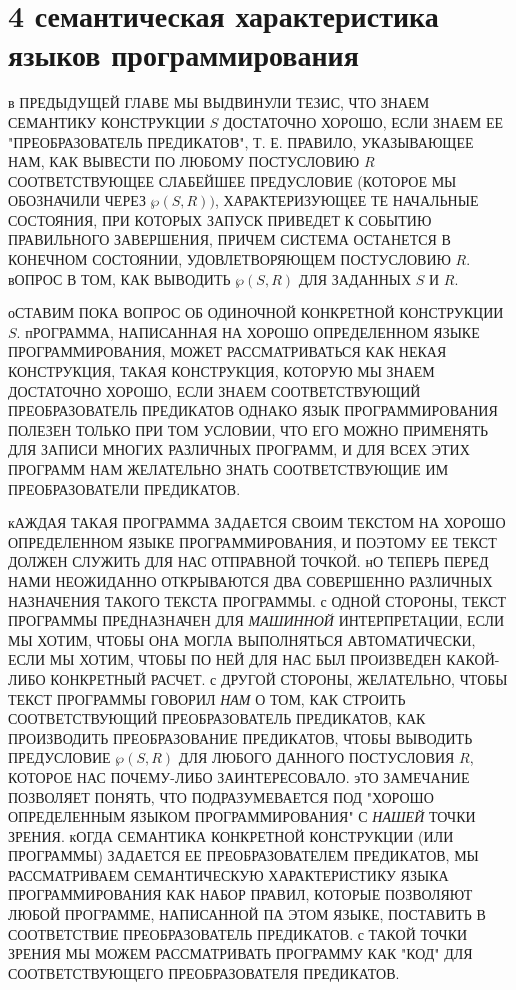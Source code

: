 
\chapter{4 семантическая характеристика языков 
программирования}
в ПРЕДЫДУЩЕЙ ГЛАВЕ МЫ ВЫДВИНУЛИ ТЕЗИС, ЧТО ЗНАЕМ СЕМАНТИКУ 
КОНСТРУКЦИИ $S$ ДОСТАТОЧНО ХОРОШО, ЕСЛИ ЗНАЕМ ЕЕ 
"ПРЕОБРАЗОВАТЕЛЬ ПРЕДИКАТОВ", Т. Е. ПРАВИЛО, УКАЗЫВАЮЩЕЕ НАМ, 
КАК ВЫВЕСТИ ПО ЛЮБОМУ ПОСТУСЛОВИЮ $R$ СООТВЕТСТВУЮЩЕЕ 
СЛАБЕЙШЕЕ ПРЕДУСЛОВИЕ (КОТОРОЕ МЫ ОБОЗНАЧИЛИ ЧЕРЕЗ 
$\wp(S, R))$, ХАРАКТЕРИЗУЮЩЕЕ ТЕ НАЧАЛЬНЫЕ СОСТОЯНИЯ, ПРИ 
КОТОРЫХ ЗАПУСК ПРИВЕДЕТ К СОБЫТИЮ ПРАВИЛЬНОГО ЗАВЕРШЕНИЯ, 
ПРИЧЕМ СИСТЕМА ОСТАНЕТСЯ В КОНЕЧНОМ СОСТОЯНИИ, 
УДОВЛЕТВОРЯЮЩЕМ ПОСТУСЛОВИЮ $R$. вОПРОС В ТОМ, КАК ВЫВОДИТЬ 
$\wp(S, R)$ ДЛЯ ЗАДАННЫХ $S$ И $R$.

оСТАВИМ ПОКА ВОПРОС ОБ ОДИНОЧНОЙ КОНКРЕТНОЙ КОНСТРУКЦИИ $S$. 
пРОГРАММА, НАПИСАННАЯ НА ХОРОШО ОПРЕДЕЛЕННОМ ЯЗЫКЕ 
ПРОГРАММИРОВАНИЯ, МОЖЕТ РАССМАТРИВАТЬСЯ КАК НЕКАЯ 
КОНСТРУКЦИЯ, ТАКАЯ КОНСТРУКЦИЯ, КОТОРУЮ МЫ ЗНАЕМ ДОСТАТОЧНО 
ХОРОШО, ЕСЛИ ЗНАЕМ СООТВЕТСТВУЮЩИЙ ПРЕОБРАЗОВАТЕЛЬ ПРЕДИКАТОВ 
ОДНАКО ЯЗЫК ПРОГРАММИРОВАНИЯ ПОЛЕЗЕН ТОЛЬКО ПРИ ТОМ УСЛОВИИ, 
ЧТО ЕГО МОЖНО ПРИМЕНЯТЬ ДЛЯ ЗАПИСИ МНОГИХ РАЗЛИЧНЫХ ПРОГРАММ, 
И ДЛЯ ВСЕХ ЭТИХ ПРОГРАММ НАМ ЖЕЛАТЕЛЬНО ЗНАТЬ СООТВЕТСТВУЮЩИЕ 
ИМ ПРЕОБРАЗОВАТЕЛИ ПРЕДИКАТОВ.

 кАЖДАЯ ТАКАЯ ПРОГРАММА ЗАДАЕТСЯ СВОИМ ТЕКСТОМ НА ХОРОШО 
ОПРЕДЕЛЕННОМ ЯЗЫКЕ ПРОГРАММИРОВАНИЯ, И ПОЭТОМУ ЕЕ ТЕКСТ 
ДОЛЖЕН СЛУЖИТЬ ДЛЯ НАС ОТПРАВНОЙ ТОЧКОЙ. нО ТЕПЕРЬ ПЕРЕД НАМИ 
НЕОЖИДАННО ОТКРЫВАЮТСЯ ДВА СОВЕРШЕННО РАЗЛИЧНЫХ НАЗНАЧЕНИЯ 
ТАКОГО ТЕКСТА ПРОГРАММЫ. с ОДНОЙ СТОРОНЫ, ТЕКСТ ПРОГРАММЫ 
ПРЕДНАЗНАЧЕН ДЛЯ \emph{МАШИННОЙ} ИНТЕРПРЕТАЦИИ, ЕСЛИ МЫ 
ХОТИМ, ЧТОБЫ ОНА МОГЛА ВЫПОЛНЯТЬСЯ АВТОМАТИЧЕСКИ, ЕСЛИ МЫ 
ХОТИМ, ЧТОБЫ ПО НЕЙ ДЛЯ НАС БЫЛ ПРОИЗВЕДЕН КАКОЙ-ЛИБО 
КОНКРЕТНЫЙ РАСЧЕТ. с ДРУГОЙ СТОРОНЫ, ЖЕЛАТЕЛЬНО, ЧТОБЫ ТЕКСТ 
ПРОГРАММЫ ГОВОРИЛ \emph{НАМ} О ТОМ, КАК СТРОИТЬ 
СООТВЕТСТВУЮЩИЙ ПРЕОБРАЗОВАТЕЛЬ ПРЕДИКАТОВ, КАК ПРОИЗВОДИТЬ 
ПРЕОБРАЗОВАНИЕ ПРЕДИКАТОВ, ЧТОБЫ ВЫВОДИТЬ ПРЕДУСЛОВИЕ 
$\wp(S, R)$ ДЛЯ ЛЮБОГО ДАННОГО ПОСТУСЛОВИЯ $R$, КОТОРОЕ НАС 
ПОЧЕМУ-ЛИБО ЗАИНТЕРЕСОВАЛО. эТО ЗАМЕЧАНИЕ ПОЗВОЛЯЕТ ПОНЯТЬ, 
ЧТО ПОДРАЗУМЕВАЕТСЯ ПОД "ХОРОШО ОПРЕДЕЛЕННЫМ ЯЗЫКОМ 
ПРОГРАММИРОВАНИЯ" С \emph{НАШЕЙ} ТОЧКИ ЗРЕНИЯ. кОГДА 
СЕМАНТИКА КОНКРЕТНОЙ КОНСТРУКЦИИ (ИЛИ ПРОГРАММЫ) ЗАДАЕТСЯ ЕЕ 
ПРЕОБРАЗОВАТЕЛЕМ ПРЕДИКАТОВ, МЫ РАССМАТРИВАЕМ СЕМАНТИЧЕСКУЮ 
ХАРАКТЕРИСТИКУ ЯЗЫКА ПРОГРАММИРОВАНИЯ КАК НАБОР ПРАВИЛ, 
КОТОРЫЕ ПОЗВОЛЯЮТ ЛЮБОЙ ПРОГРАММЕ, НАПИСАННОЙ ПА ЭТОМ ЯЗЫКЕ, 
ПОСТАВИТЬ В СООТВЕТСТВИЕ ПРЕОБРАЗОВАТЕЛЬ ПРЕДИКАТОВ. с ТАКОЙ 
ТОЧКИ ЗРЕНИЯ МЫ МОЖЕМ РАССМАТРИВАТЬ ПРОГРАММУ КАК "КОД" ДЛЯ 
СООТВЕТСТВУЮЩЕГО ПРЕОБРАЗОВАТЕЛЯ ПРЕДИКАТОВ.

